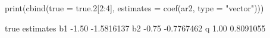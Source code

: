 \begin{Schunk}
\begin{Sinput}
 print(cbind(true = true.2[2:4], estimates = coef(ar2, type = "vector")))
\end{Sinput}
\begin{Soutput}
    true  estimates
b1 -1.50 -1.5816137
b2 -0.75 -0.7767462
q   1.00  0.8091055
\end{Soutput}
\end{Schunk}
